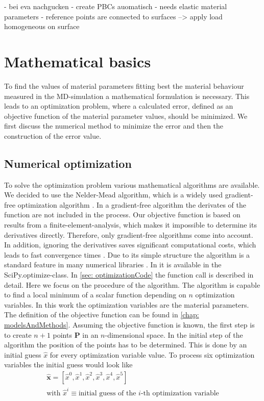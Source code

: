 - bei eva nachgucken
- create PBCs auomatisch
- needs elastic material parameters
- reference points are connected to surfaces --> apply load homogeneous on surface



\section{Mathematical basics} \label{sec: mathematics}

To find the values of material parameters fitting best the material behaviour measured in the MD-simulation a mathematical formulation is necessary. This leads to an optimization problem, where a calculated error, defined as an objective function of the material parameter values, should be minimized. We first discuss the numerical method to minimize the error and then the construction of the error value.

\subsection{Numerical optimization} \label{subsec: numericalOptimization}
To solve the optimization problem various mathematical algorithms are available. We decided to use the Nelder-Mead algorithm, which is a widely used gradient-free optimization algorithm \cite{gao_implementing_2012}. In a gradient-free algorithm the derivates of the function are not included in the process. Our objective function is based on results from a finite-element-analysis, which makes it impossible to determine its derivatives directly. Therefore, only gradient-free algorithms come into account. In addition, ignoring the derivatives saves significant computational costs, which leads to fast convergence times \cite{pham_comparative_2011}. Due to its simple structure the algorithm is a standard feature in many numerical libraries \cite{singer_efficient_2004}. In  it is available in the SciPy.optimize-class. In \autoref{sec: optimizationCode} the function call is described in detail. Here we focus on the procedure of the algorithm. The algorithm is capable to find a local minimum of a scalar function depending on $n$ optimization variables. In this work the optimization variables are the material parameters. The definition of the objective function can be found in \autoref{chap: modelsAndMethods}. Assuming the objective function is known, the first step is to create $n+1$ points $\mathbf{P}$ in an $n$-dimensional space. In the initial step of the algorithm the position of the points has to be determined. This is done by an initial guess $\hat{x}$ for every optimization variable value. To process six optimization variables the initial guess would look like
\begin{gather*}
    \mathbf{\hat{x}} = [\hat{x}^0, \hat{x}^1, \hat{x}^2, \hat{x}^3, \hat{x}^4, \hat{x}^5] \\
    \text{with } \hat{x}^i \equiv \text{initial guess of the $i$-th optimization variable}
\end{gather*}


